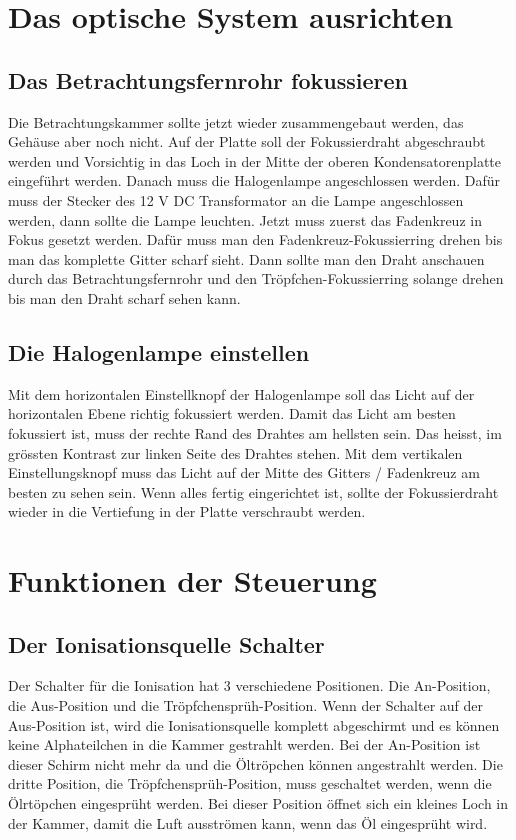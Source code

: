 \section{Das optische System ausrichten}\label{sec:optischesSystem}
\subsection{Das Betrachtungsfernrohr fokussieren}
Die Betrachtungskammer sollte jetzt wieder zusammengebaut werden, das Gehäuse aber noch nicht. Auf der Platte soll der Fokussierdraht abgeschraubt werden und Vorsichtig in das Loch in der Mitte der oberen Kondensatorenplatte eingeführt werden. Danach muss die Halogenlampe angeschlossen werden. Dafür muss der Stecker des 12 V DC Transformator an die Lampe angeschlossen werden, dann sollte die Lampe leuchten. Jetzt muss zuerst das Fadenkreuz in Fokus gesetzt werden. Dafür muss man den Fadenkreuz-Fokussierring drehen bis man das komplette Gitter scharf sieht. Dann sollte man den Draht anschauen durch das Betrachtungsfernrohr und den Tröpfchen-Fokussierring solange drehen bis man den Draht scharf sehen kann. 

\subsection{Die Halogenlampe einstellen}\label{sub:Halogenlampe}
Mit dem horizontalen Einstellknopf der Halogenlampe soll das Licht auf der horizontalen Ebene richtig fokussiert werden. Damit das Licht am besten fokussiert ist, muss der rechte Rand des Drahtes am hellsten sein. Das heisst, im grössten Kontrast zur linken Seite des Drahtes stehen. Mit dem vertikalen Einstellungsknopf muss das Licht auf der Mitte des Gitters / Fadenkreuz am besten zu sehen sein. Wenn alles fertig eingerichtet ist, sollte der Fokussierdraht wieder in die Vertiefung in der Platte verschraubt werden.

\section{Funktionen der Steuerung}\label{sec:funktionen}
\subsection{Der Ionisationsquelle Schalter}\label{sub:ionisationquelle}
Der Schalter für die Ionisation hat 3 verschiedene Positionen. Die An-Position, die Aus-Position und die Tröpfchensprüh-Position. Wenn der Schalter auf der Aus-Position ist, wird die Ionisationsquelle komplett abgeschirmt und es können keine Alphateilchen in die Kammer gestrahlt werden. Bei der An-Position ist dieser Schirm nicht mehr da und die Öltröpchen können angestrahlt werden. Die dritte Position, die Tröpfchensprüh-Position, muss geschaltet werden, wenn die Ölrtöpchen eingesprüht werden. Bei dieser Position öffnet sich ein kleines Loch in der Kammer, damit die Luft ausströmen kann, wenn das Öl eingesprüht wird.

